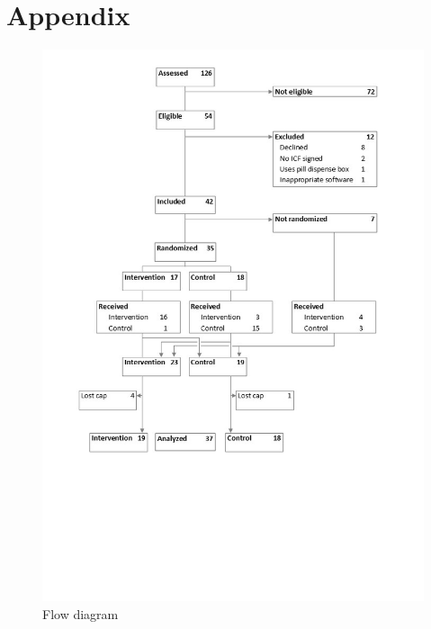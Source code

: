 \documentclass[twocolumn, issue, empirical, authordate]{jote-new-article}
\begin{document}
\section{Appendix}
\begin{figure}[t!]
\label{fig:fig1}
\begin{fullwidth}
\includegraphics[width=1.5\linewidth]{media/media/image1.jpg}
\end{fullwidth}
\caption{Flow diagram}
\end{figure}
\end{document}
